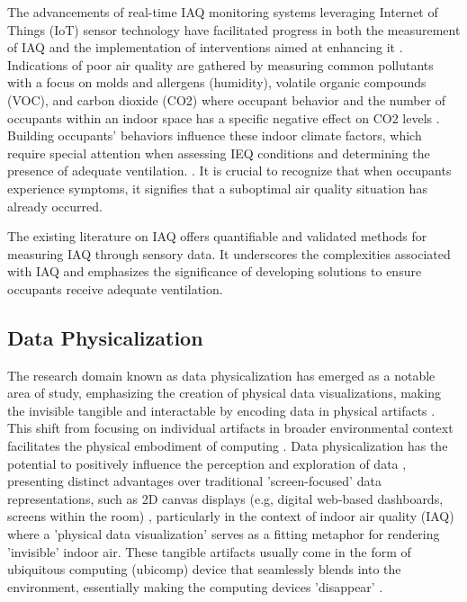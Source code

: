The advancements of real-time IAQ monitoring systems leveraging Internet of Things (IoT) sensor technology have facilitated progress in both the measurement of IAQ and the implementation of interventions aimed at enhancing it \cite{pantelic_transformational_2022}. Indications of poor air quality are gathered by measuring common pollutants with a focus on molds and allergens (humidity), volatile organic compounds (VOC), and carbon dioxide (CO2) \cite{klepeis_national_2001} where occupant behavior and the number of occupants within an indoor space has a specific negative effect on CO2 levels \cite{fromme_indoor_2023}. Building occupants' behaviors influence these indoor climate factors, which require special attention when assessing IEQ conditions and determining the presence of adequate ventilation. \cite{du_indoor_2020}. It is crucial to recognize that when occupants experience symptoms, it signifies that a suboptimal air quality situation has already occurred.

The existing literature on IAQ offers quantifiable and validated methods for measuring IAQ through sensory data. It underscores the complexities associated with IAQ and emphasizes the significance of developing solutions to ensure occupants receive adequate ventilation.


\subsection{Data Physicalization}
\label{sec:phys}

The research domain known as data physicalization \cite{alexander_data_2019, jansen_opportunities_2015} has emerged as a notable area of study, emphasizing the creation of physical data visualizations, making the invisible tangible and interactable by encoding data in physical artifacts \cite{ranasinghe_encoding_2023}. This shift from focusing on individual artifacts in broader environmental context facilitates the physical embodiment of computing \cite{dragicevic_data_2020}. Data physicalization has the potential to positively influence the perception and exploration of data \cite{jansen_opportunities_2015, wang_emotional_2019, stusak_evaluating_2015}, presenting distinct advantages over traditional 'screen-focused' data representations, such as 2D canvas displays (e.g, digital web-based dashboards, screens within the room) \cite{hornecker_design_2023, jansen_evaluating_2013}, particularly in the context of indoor air quality (IAQ) where a 'physical data visualization' serves as a fitting metaphor for rendering 'invisible' indoor air. These tangible artifacts usually come in the form of ubiquitous computing (ubicomp) \cite{bell_yesterdays_2007} device that seamlessly blends into the environment, essentially making the computing devices 'disappear' \cite{weiser_computer_1999}. 

